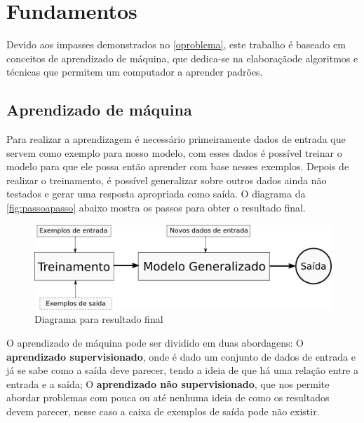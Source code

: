 \chapter{Fundamentos}\label{fundamentos}

Devido aos impasses demonstrados no \autoref{oproblema}, este trabalho é baseado em conceitos de aprendizado de máquina, que dedica-se na elaboraçãode algoritmos e técnicas que permitem um computador a aprender padrões.  

\section{Aprendizado de máquina}\label{sec:aprendizadodemaquina}

Para realizar a aprendizagem é necessário primeiramente dados de entrada que servem como exemplo para nosso modelo, com esses dados é possível treinar o modelo para que ele possa então aprender com base nesses exemplos. Depois de realizar o treinamento, é possível generalizar sobre outros dados ainda não testados e gerar uma resposta apropriada como saída. O diagrama da \autoref{fig:passoapasso} abaixo mostra os passos para obter o resultado final.

\begin{figure}[htb]
	  \caption{Diagrama para resultado final}\label{fig:passoapasso}
	  \begin{center}
	      \includegraphics[scale=0.5]{img/passoapasso}
	  \end{center}
\end{figure}


O aprendizado de máquina pode ser dividido em duas abordagens: O \textbf{aprendizado supervisionado}, onde é dado um conjunto de dados de entrada e já se sabe como a saída deve parecer, tendo a ideia de que há uma relação entre a entrada e a saída; O \textbf{aprendizado não supervisionado}, que nos permite abordar problemas com pouca ou até nenhuma ideia de como os resultados devem parecer, nesse caso a caixa de exemplos de saída pode não existir.

